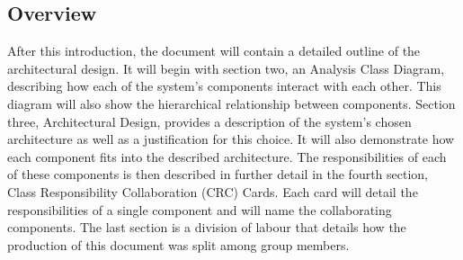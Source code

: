\documentclass[]{article}
\begin{document}
\subsection{Overview}
\label{sub:overview}
After this introduction, the document will contain a detailed outline of the architectural design. It will begin with section two, an Analysis Class Diagram, describing how each of the system's components interact with each other. This diagram will also show the hierarchical relationship between components. Section three, Architectural Design, provides a description of the system's chosen architecture as well as a justification for this choice. It will also demonstrate how each component fits into the described architecture. The responsibilities of each of these components is then described in further detail in the fourth section, Class Responsibility Collaboration (CRC) Cards. Each card will detail the responsibilities of a single component and will name the collaborating components. The last section is a division of labour that details how the production of this document was split among group members.   

\newpage
\end{document}
